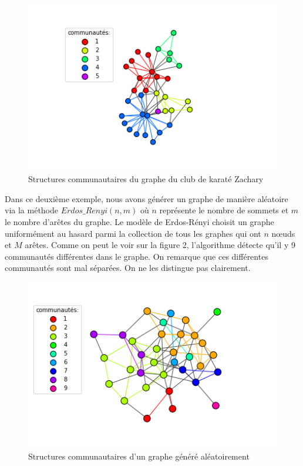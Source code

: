 \documentclass[frenchb]{report}
\newcommand{\1}{\mathbbm{1}}
\theoremstyle{definition}\newtheorem{defn}{Définition}
\theoremstyle{definition}\newtheorem{exm}{Exemple}
\theoremstyle{definition}\newtheorem{nota}{Notation}
\theoremstyle{definition}\newtheorem{rem}{Remarque}
\begin{document}
\begin{figure}[H]
	\centering
	\includegraphics[scale=0.7]{images/G_zachary.png}
	\caption{Structures communautaires du graphe du club de karaté Zachary}
\end{figure}



Dans ce deuxième exemple, nous avons générer un graphe de manière aléatoire via la méthode $Erdos\_Renyi(n,m)$ où $n$ représente le nombre de sommets et $m$ le nombre d'arêtes du graphe.
Le modèle de Erdos-Rényi choisit un graphe uniformément au hasard parmi la collection de tous les graphes qui ont $n$ nœuds et $M$ arêtes.
Comme on peut le voir sur la figure 2, l'algorithme détecte qu'il y 9 communautés différentes dans le graphe. On remarque que ces différentes communautés sont mal séparées. On ne les distingue pas clairement.

\begin{figure}[H]
	\centering
	\includegraphics[scale=0.7]{images/random_network2.png}
	\caption{Structures communautaires d'un graphe généré aléatoirement}
\end{figure}
\end{document}
